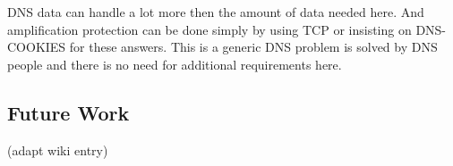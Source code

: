 DNS data can handle a lot more then the amount of data needed here. And
amplification protection can be done simply by using TCP or insisting on
DNS-COOKIES for these answers. This is a generic DNS problem is solved by DNS
people and there is no need for additional requirements here.

\subsection{Future Work}

(adapt wiki entry)

